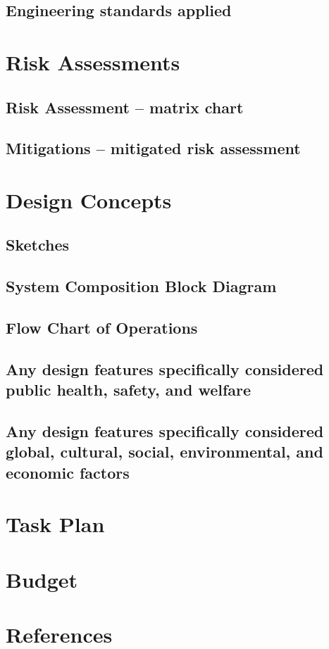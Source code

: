 \documentclass[a4paper,10pt]{article}
\begin{document}
\subsection{Engineering standards applied}
\section{Risk Assessments}
\subsection{Risk Assessment – matrix chart}
\subsection{Mitigations – mitigated risk assessment}
\section{Design Concepts}
\subsection{Sketches}
\subsection{System Composition Block Diagram}
\subsection{Flow Chart of Operations}
\subsection{Any design features specifically  considered public health, safety, and welfare}
\subsection{Any design features specifically  considered global, cultural, social, environmental, and economic factors}
\section{Task Plan}

\section{Budget}

\section{References}
\printbibliography
\end{document}
